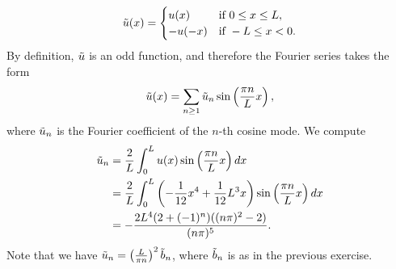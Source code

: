 \documentclass[11pt]{article}
\begin{document}
\begin{solution}
\begin{align*}
        \Tilde u(x) = \begin{cases}
            u(x) & \text{if } 0 \leq x \leq L,\\
            -u(-x) & \text{if } -L \leq x < 0.
        \end{cases}
    \end{align*}
    By definition, $\Tilde u$ is an odd function, and therefore the Fourier series takes the form 
    \begin{align*}
        \Tilde u(x) = \sum_{n \geq 1} \Tilde u_n \sin\left(\frac{\pi n}{L} x\right),
    \end{align*}
    where $\Tilde u_{n}$ is the Fourier coefficient of the $n$-th cosine mode. 
    We compute 
    \begin{align*}
        \Tilde u_n 
        &= 
        \frac{2}{L} \int_0^L u(x) \sin\left(\frac{\pi n}{L} x\right) dx
        \\&
        = 
        \frac{2}{L} \int_0^L \left(-\frac{1}{12} x^4 + \frac{1}{12} L^3 x\right) \sin\left(\frac{\pi n}{L} x\right) dx
        \\&
        = 
        -\frac{2 L^4 (2 + (-1)^n)((n \pi)^2 - 2)}{(n \pi)^5}
        .
    \end{align*}
    Note that we have $\Tilde u_n = \left(\frac{L}{\pi n}\right)^2 \Tilde{b}_n$, where $\Tilde b_n$ is as in the previous exercise.
\end{solution}
\end{document}

